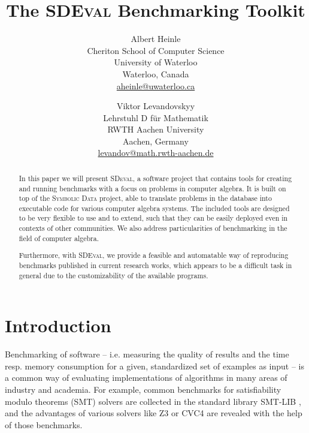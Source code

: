 \documentclass[oribibl,11pt]{article}
\begin{document}
\title{The \textsc{SDEval} Benchmarking Toolkit}

\author{Albert Heinle\\
Cheriton School of Computer Science\\ University of
Waterloo\\ Waterloo, Canada\\\url{aheinle@uwaterloo.ca} \and Viktor Levandovskyy\\
Lehrstuhl D f\"ur Mathematik\\ RWTH
 Aachen University\\ Aachen, Germany\\
\url{levandov@math.rwth-aachen.de}}


\maketitle

\begin{abstract}
  In this paper we will present \textsc{SDeval}, a software project
  that contains tools for creating and running benchmarks with a focus
  on problems in computer algebra. It is built on top of the
  \textsc{Symbolic Data} project, able to translate problems in the
  database into executable code for various computer algebra
  systems. The included tools are designed to be very flexible to use
  and to extend, such that they can be easily deployed even in contexts of
  other communities. We also address particularities of benchmarking in the field of computer algebra.

Furthermore, with \textsc{SDEval}, we provide a feasible and
automatable way of reproducing benchmarks published in current
research works, which appears to be a difficult task in general due to
the customizability of the available programs.

\end{abstract}


\section{Introduction}

Benchmarking of software -- i.e. measuring the quality of results and
the time resp. memory consumption for a given, standardized set of
examples as input -- is a common way of evaluating implementations of
algorithms in many areas of industry and academia. For example, common
benchmarks for satisfiability modulo theorems (SMT) solvers are
collected in the standard library \textsc{SMT-LIB}
\cite{barrett2010smt}, and the advantages of various solvers like
\textsc{Z3} \cite{de2008z3} or \textsc{CVC4}
\cite{barrett2011cvc4} are revealed with the help of those
benchmarks.
\end{document}
